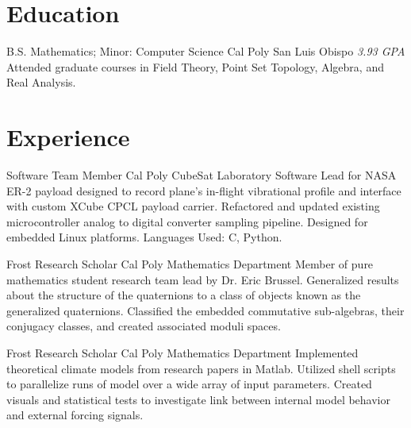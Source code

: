 \documentclass[a4paper, 11pt, sans]{moderncv}
\begin{document}
\makecvtitle

\section{Education}
        {B.S. Mathematics; Minor: Computer Science}
        {Cal Poly}
        {San Luis Obispo}
        {\textit{3.93 GPA}}
        {
            Attended graduate courses in Field Theory, Point Set Topology, Algebra, and Real Analysis. \newline
        }

\section{Experience}

        {Software Team Member}
        {Cal Poly CubeSat Laboratory}{}{}
        {
            Software Lead for NASA ER-2 payload designed to record plane's in-flight vibrational profile and interface with custom XCube CPCL payload carrier.\newline
            Refactored and updated existing microcontroller analog to digital converter sampling pipeline.
            Designed for embedded Linux platforms. Languages Used: C, Python.\newline
        }

        {Frost Research Scholar}
        {Cal Poly Mathematics Department}{}{}
        {
            Member of pure mathematics student research team lead by Dr. Eric Brussel.\newline
            Generalized results about the structure of the quaternions to a class of objects known as the generalized quaternions.\newline
            Classified the embedded commutative sub-algebras, their conjugacy classes, and created associated moduli spaces.\newline 
        }

        {Frost Research Scholar}
        {Cal Poly Mathematics Department}{}{}
        {
            Implemented theoretical climate models from research papers in Matlab.\newline
            Utilized shell scripts to parallelize runs of model over a wide array of input parameters.\newline
            Created visuals and statistical tests to investigate link between internal model behavior and external forcing signals.\newline 
        }
\end{document}
